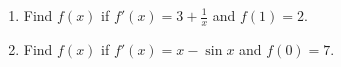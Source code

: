 \begin{enumerate}
\item Find $f(x)$ if $f'(x) = 3 + \frac{1}{x}$ and $f(1) = 2$.

\item Find $f(x)$ if $f'(x) = x - \sin x$ and $f(0) = 7$.

\end{enumerate}
